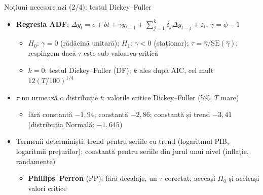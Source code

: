 \begin{frame}{Noțiuni necesare azi (2/4): testul Dickey--Fuller}
\itemsize{\small}
\begin{itemize}
    \item \textbf{Regresia ADF}: $\Delta y_t = c + bt + \gamma y_{t-1} + \sum_{j=1}^{k}\delta_j\Delta y_{t-j} + \varepsilon_t$, $\gamma = \phi - 1$
    \begin{itemize}
        \item $H_0$: $\gamma = 0$ (rădăcină unitară); $H_1$: $\gamma < 0$ (staționar); $\tau = \hat\gamma/\mathrm{SE}(\hat\gamma)$; respingem dacă $\tau$ este sub valoarea critică
        \item $k = 0$: testul Dickey--Fuller (DF); $k$ ales după AIC, cel mult $12(T/100)^{1/4}$
    \end{itemize}
    \item $\tau$ nu urmează o distribuție $t$: valorile critice Dickey--Fuller (5\%, $T$ mare)
    \begin{itemize}
        \item fără constantă $-1{,}94$; constantă $-2{,}86$; constantă și trend $-3{,}41$ (distribuția Normală: $-1{,}645$)
    \end{itemize}
    \item Termenii determiniști: trend pentru seriile cu trend (logaritmul PIB, logaritmii prețurilor); constantă pentru seriile din jurul unui nivel (inflație, randamente)
    \begin{itemize}
        \item \textbf{Phillips--Perron} (PP): fără decalaje, un $\tau$ corectat; aceeași $H_0$ și aceleași valori critice
    \end{itemize}
\end{itemize}
\end{frame}

